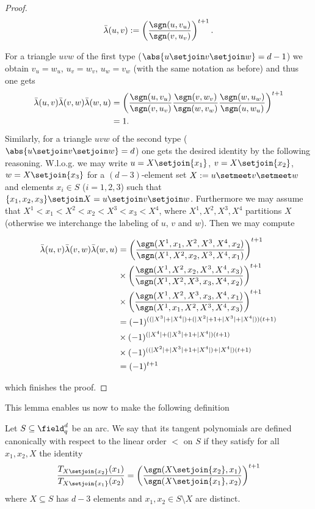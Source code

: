 \message{ !name(OnTheRAIDProblem.tex)}\documentclass[8pt,a4paper]{article}
\begin{document}
\begin{proof}
\begin{equation}
\bar{\lambda}(u,v):=\left(\frac{\sgn(u,v_u)}{\sgn(v,u_v)}\right)^{t+1}\text{.}
\end{equation}

For a triangle $uvw$ of the first type ($\abs{u\setjoin v\setjoin w}=d-1$) we obtain $v_u=w_u$, $u_v=w_v$, $u_w=v_w$ (with the same notation as before) and thus one gets
\begin{align}
\bar{\lambda}(u,v)\bar{\lambda}(v,w)\bar{\lambda}(w,u) & =\left(\frac{\sgn(u,v_u)}{\sgn(v,u_v)}\frac{\sgn(v,w_v)}{\sgn(w,v_w)}\frac{\sgn(w,u_w)}{\sgn(u,w_u)}\right)^{t+1}\\
& =1\text{.}
\end{align}
Similarly, for a triangle $uvw$ of the second type ($\abs{u\setjoin v\setjoin w}=d$) one gets the desired identity by the following reasoning. W.l.o.g. we may write $u=X\setjoin\{x_1\}$, $v=X\setjoin\{x_2\}$, $w=X\setjoin\{x_3\}$ for a $(d-3)$-element set $X:=u\setmeet v\setmeet w$ and elements $x_i\in S$ ($i=1,2,3$) such that $\{x_1,x_2,x_3\}\setjoin X=u\setjoin v\setjoin w$. Furthermore we may assume that $X^1<x_1<X^2<x_2<X^3<x_3<X^4$, where $X^1,X^2,X^3,X^4$ partitions $X$ (otherwise we interchange the labeling of $u$, $v$ and $w$). Then we may compute

\begin{align}
\bar{\lambda}(u,v)\bar{\lambda}(v,w)\bar{\lambda}(w,u) 
& = \left(\frac{\sgn(X^1,x_1,X^2,X^3,X^4,x_2)}{\sgn(X^1,X^2,x_2,X^3,X^4,x_1)}\right)^{t+1}\\
& \times \left(\frac{\sgn(X^1,X^2,x_2,X^3,X^4,x_3)}{\sgn(X^1,X^2,X^3,x_3,X^4,x_2)}\right)^{t+1}\\
& \times \left(\frac{\sgn(X^1,X^2,X^3,x_3,X^4,x_1)}{\sgn(X^1,x_1,X^2,X^3,X^4,x_3)}\right)^{t+1}\\
& = (-1)^{((|X^3|+|X^4|)+(|X^2|+1+|X^3|+|X^4|))(t+1)}\\
& \times (-1)^{(|X^4|+(|X^3|+1+|X^4|)(t+1)}\\
& \times (-1)^{((|X^2|+|X^3|+1+|X^4|)+|X^4|)(t+1)}\\
& = (-1)^{t+1}
\end{align}

which finishes the proof.
\end{proof}

This lemma enables us now to make the following definition

\begin{definition}
Let $S\subseteq\field_q^d$ be an arc. We say that its tangent polynomials are defined canonically with respect to the linear order $<$ on $S$ if they satisfy for all $x_1,x_2,X$ the identity
\begin{equation}
\frac{T_{X\setjoin\{x_2\}}(x_1)}{T_{X\setjoin\{x_1\}}(x_2)}=\left(\frac{\sgn(X\setjoin\{x_2\},x_1)}{\sgn(X\setjoin\{x_1\},x_2)}\right)^{t+1}
\end{equation}
where $X\subseteq S$ has $d-3$ elements and $x_1,x_2\in S\setminus X$ are distinct.
\end{definition}
\end{document}
